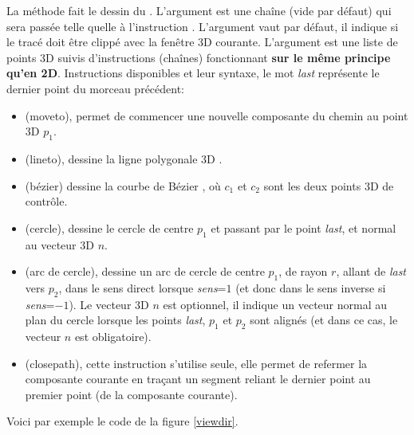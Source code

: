 La méthode  fait le dessin du . L'argument  est une chaîne (vide par défaut) qui sera passée telle quelle à l'instruction \drawcmd . L'argument  vaut \false par défaut, il indique si le tracé doit être clippé avec la fenêtre 3D courante. L'argument  est une liste de points 3D suivis d'instructions (chaînes) fonctionnant \textbf{sur le même principe qu'en 2D}. Instructions disponibles et leur syntaxe, le mot \emph{last} représente le dernier point du morceau précédent:
      \begin{itemize}
      \item {} (moveto), permet de commencer une nouvelle composante du chemin au point 3D $p_1$.
      \item {} (lineto), dessine la ligne polygonale 3D .
      \item {} (bézier) dessine la courbe de Bézier , où $c_1$ et $c_2$ sont les deux points 3D de contrôle.
      \item {} (cercle), dessine le cercle de centre $p_1$ et passant par le point \emph{last}, et normal au vecteur 3D $n$.
      \item {} (arc de cercle), dessine un arc de cercle de centre $p_1$, de rayon $r$, allant de \emph{last} vers $p_2$, dans le sens direct lorsque \emph{sens}=$1$ (et donc dans le sens inverse si \emph{sens}=$-1$). Le vecteur 3D $n$ est optionnel, il indique un vecteur normal au plan du cercle lorsque les points \emph{last}, $p_1$ et $p_2$ sont alignés (et dans ce cas, le vecteur $n$ est obligatoire).
      \item {} (closepath), cette instruction s'utilise seule, elle permet de refermer la composante courante en traçant un segment reliant le dernier point au premier point (de la composante courante).
      \end{itemize}      

Voici par exemple le code de la figure \ref{viewdir}.

